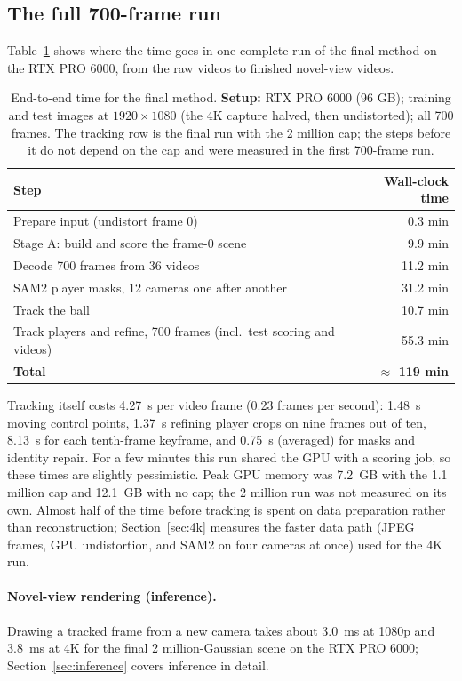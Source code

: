 \documentclass[11pt]{article}
\begin{document}
\subsection{The full 700-frame run}
Table~\ref{tab:e2e} shows where the time goes in one complete run of the final method on the RTX PRO
6000, from the raw videos to finished novel-view videos.
\begin{table}[!htbp]\centering
\caption{End-to-end time for the final method. \textbf{Setup:} RTX PRO 6000 (96 GB); training and test images at $1920\times1080$ (the 4K capture halved, then undistorted); all 700 frames. The tracking row is
the final run with the 2 million cap; the steps before it do not depend on the cap and were
measured in the first 700-frame run.}\label{tab:e2e}
\small\begin{tabular}{lr}\toprule
Step & Wall-clock time \\\midrule
Prepare input (undistort frame 0) & 0.3 min \\
Stage A: build and score the frame-0 scene & 9.9 min \\
Decode 700 frames from 36 videos & 11.2 min \\
SAM2 player masks, 12 cameras one after another & 31.2 min \\
Track the ball & 10.7 min \\
Track players and refine, 700 frames (incl.\ test scoring and videos) & 55.3 min \\\midrule
\textbf{Total} & \textbf{$\approx$ 119 min} \\\bottomrule
\end{tabular}\end{table}
Tracking itself costs 4.27~s per video frame (0.23 frames per second): 1.48~s moving control points,
1.37~s refining player crops on nine frames out of ten, 8.13~s for each tenth-frame keyframe, and
0.75~s (averaged) for masks and identity repair. For a few minutes this run shared the GPU with a
scoring job, so these times are slightly pessimistic. Peak GPU memory was 7.2~GB with the 1.1 million
cap and 12.1~GB with no cap; the 2 million run was not measured on its own. Almost half of the time
before tracking is spent on data preparation rather than reconstruction; Section~\ref{sec:4k} measures
the faster data path (JPEG frames, GPU undistortion, and SAM2 on four cameras at once) used for the
4K run.

\paragraph{Novel-view rendering (inference).} Drawing a tracked frame from a new camera takes about
3.0~ms at 1080p and 3.8~ms at 4K for the final 2 million-Gaussian scene on the RTX PRO 6000;
Section~\ref{sec:inference} covers inference in detail.
\end{document}
